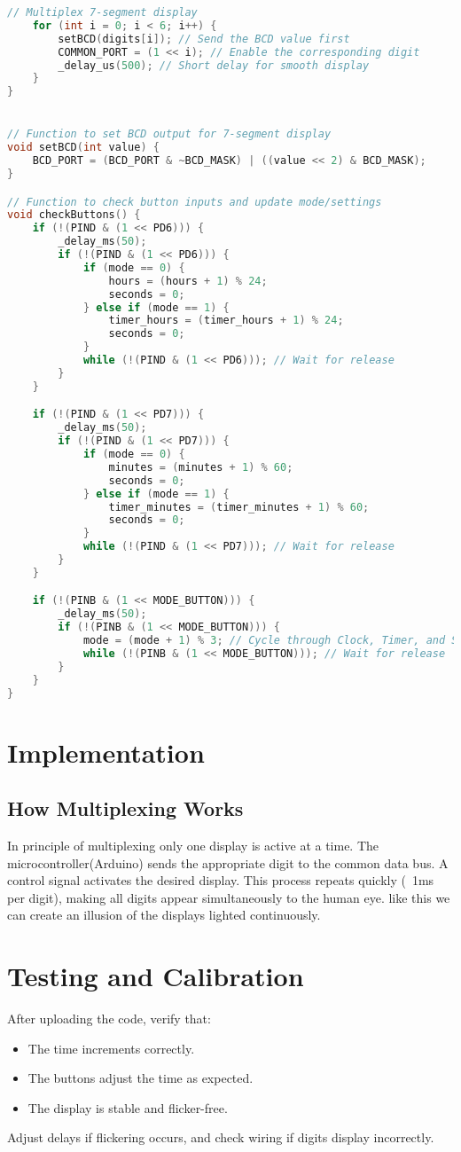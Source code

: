 \documentclass[journal]{IEEEtran}
\begin{document}
\begin{lstlisting}[language = C]
    // Multiplex 7-segment display
    for (int i = 0; i < 6; i++) {
        setBCD(digits[i]); // Send the BCD value first
        COMMON_PORT = (1 << i); // Enable the corresponding digit
        _delay_us(500); // Short delay for smooth display
    }
}


// Function to set BCD output for 7-segment display
void setBCD(int value) {
    BCD_PORT = (BCD_PORT & ~BCD_MASK) | ((value << 2) & BCD_MASK);
}

// Function to check button inputs and update mode/settings
void checkButtons() {
    if (!(PIND & (1 << PD6))) {
        _delay_ms(50);
        if (!(PIND & (1 << PD6))) {
            if (mode == 0) {
                hours = (hours + 1) % 24;
                seconds = 0;
            } else if (mode == 1) {
                timer_hours = (timer_hours + 1) % 24;
                seconds = 0;
            }
            while (!(PIND & (1 << PD6))); // Wait for release
        }
    }

    if (!(PIND & (1 << PD7))) {
        _delay_ms(50);
        if (!(PIND & (1 << PD7))) {
            if (mode == 0) {
                minutes = (minutes + 1) % 60;
                seconds = 0;
            } else if (mode == 1) {
                timer_minutes = (timer_minutes + 1) % 60;
                seconds = 0;
            }
            while (!(PIND & (1 << PD7))); // Wait for release
        }
    }

    if (!(PINB & (1 << MODE_BUTTON))) {
        _delay_ms(50);
        if (!(PINB & (1 << MODE_BUTTON))) {
            mode = (mode + 1) % 3; // Cycle through Clock, Timer, and Stopwatch
            while (!(PINB & (1 << MODE_BUTTON))); // Wait for release
        }
    }
}
\end{lstlisting}
\section{Implementation}
\subsection{How Multiplexing Works}
In principle of multiplexing only one display is active at a time. The microcontroller(Arduino) sends the appropriate digit to the common data bus. A control signal activates the desired display. This process repeats quickly (~1ms per digit), making all digits appear simultaneously to the human eye. like this we can create an illusion of the displays lighted continuously.

\section{Testing and Calibration}
After uploading the code, verify that:
\begin{itemize}
\item The time increments correctly.
\item The buttons adjust the time as expected.
\item The display is stable and flicker-free.
\end{itemize}
Adjust delays if flickering occurs, and check wiring if digits display incorrectly.

 
\end{document}
